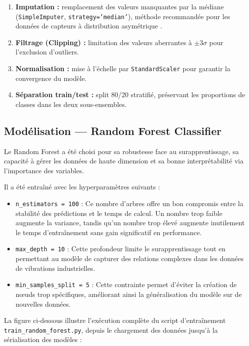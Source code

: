 \documentclass[12pt, a4paper, oneside]{report}
\begin{document}
\begin{enumerate}
  \item \textbf{Imputation :} remplacement des valeurs manquantes par la médiane
  (\texttt{SimpleImputer}, \texttt{strategy='median'}), méthode recommandée pour les
  données de capteurs à distribution asymétrique \cite{sklearn}.
  \item \textbf{Filtrage (Clipping) :} limitation des valeurs aberrantes à $\pm 3\sigma$
  pour l'exclusion d'outliers.
  \item \textbf{Normalisation :} mise à l'échelle par \texttt{StandardScaler} pour
  garantir la convergence du modèle.
  \item \textbf{Séparation train/test :} split 80/20 stratifié, préservant les proportions
  de classes dans les deux sous-ensembles.
\end{enumerate}

\subsection{Modélisation — Random Forest Classifier}

Le Random Forest \cite{breiman2001} a été choisi pour sa robustesse face au surapprentissage, sa capacité à gérer les données de haute dimension et sa bonne interprétabilité via l'importance des variables. 

Il a été entraîné avec les hyperparamètres suivants :

\begin{itemize}
  \item \texttt{n\_estimators = 100} : Ce nombre d'arbres offre un bon compromis entre la stabilité des prédictions et le temps de calcul. Un nombre trop faible augmente la variance, tandis qu'un nombre trop élevé augmente inutilement le temps d'entraînement sans gain significatif en performance.
  
  \item \texttt{max\_depth = 10} : Cette profondeur limite le surapprentissage tout en permettant au modèle de capturer des relations complexes dans les données de vibrations industrielles.
  
  \item \texttt{min\_samples\_split = 5} : Cette contrainte permet d'éviter la création de nœuds trop spécifiques, améliorant ainsi la généralisation du modèle sur de nouvelles données.
\end{itemize}

La figure ci-dessous illustre l'exécution complète du script d'entraînement
\texttt{train\_random\_forest.py}, depuis le chargement des données jusqu'à la
sérialisation des modèles :
\end{document}
